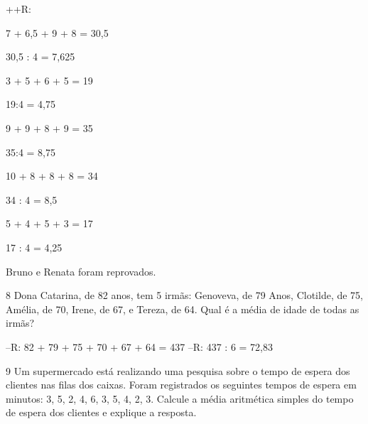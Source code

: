 {++R:
\item

7 + 6,5 + 9 + 8 = 30,5

30,5 : 4 = 7,625
\item

3 + 5 + 6 + 5 = 19

19:4 = 4,75
\item 9 + 9 + 8 + 9 = 35

35:4 = 8,75
\item

10 + 8 + 8 + 8 = 34

34 : 4 = 8,5
\item

5 + 4 + 5 + 3 = 17

17 : 4 = 4,25
\item Bruno e Renata foram reprovados.

\num{8} Dona Catarina, de 82 anos, tem 5 irmãs: Genoveva, de 79 Anos,
Clotilde, de 75, Amélia, de 70, Irene, de 67, e Tereza, de 64. Qual é a
média de idade de todas as irmãs?

--R: 82 + 79 + 75 + 70 + 67 + 64 = 437
--R: 437 : 6 = 72,83













\num{9} Um supermercado está realizando uma pesquisa sobre o tempo de espera
dos clientes nas filas dos caixas. Foram registrados os seguintes tempos
de espera em minutos: 3, 5, 2, 4, 6, 3, 5, 4, 2, 3.
Calcule a média aritmética simples do tempo de espera dos clientes e
explique a resposta.

}
